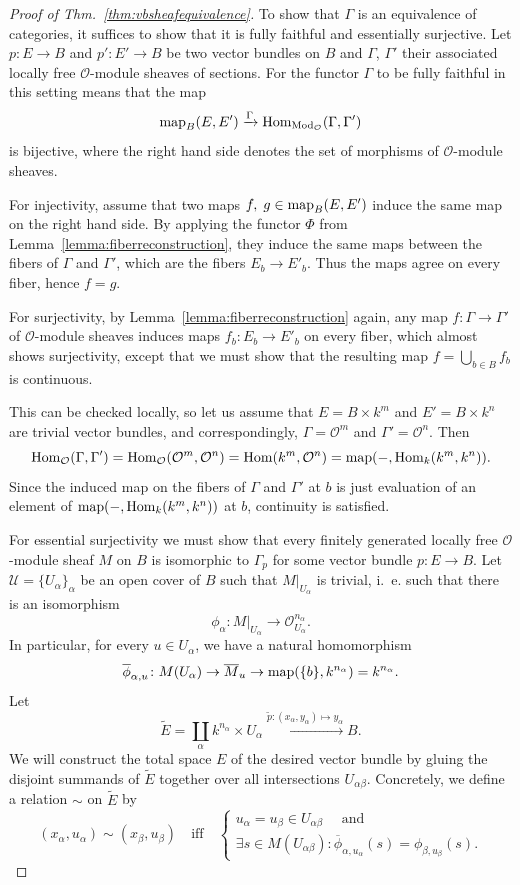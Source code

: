 \documentclass[a4paper,openany]{scrbook}
\begin{document}
\begin{proof}[Proof of Thm.~\ref{thm:vbsheafequivalence}]
To show that $\Gamma$ is an equivalence of categories, it suffices to show that it is fully faithful and essentially surjective. Let $p\colon E \to B$ and $p'\colon E' \to B$ be two vector bundles on $B$ and $\Gamma$, $\Gamma'$ their associated locally free $\mathcal O$-module sheaves of sections. For the functor $\Gamma$ to be fully faithful in this setting means that the map
\[
\operatorname{map}_B(E,E') \xrightarrow{\Gamma} \operatorname{Hom}_{\operatorname{Mod}_{\mathcal O}}(\Gamma,\Gamma')
\]
is bijective, where the right hand side denotes the set of morphisms of $\mathcal O$-module sheaves.

For injectivity, assume that two maps $f,\; g \in \operatorname{map}_B(E,E')$ induce the same map on the right hand side. By applying the functor $\Phi$ from Lemma~\ref{lemma:fiberreconstruction}, they induce the same maps between the fibers of $\Gamma$ and $\Gamma'$, which are the fibers $E_b \to E'_b$. Thus the maps agree on every fiber, hence $f=g$.

For surjectivity, by Lemma~\ref{lemma:fiberreconstruction} again, any map $f\colon \Gamma \to \Gamma'$ of $\mathcal O$-module sheaves induces maps $f_b\colon E_b \to E'_b$ on every fiber, which almost shows surjectivity, except that we must show that the resulting map $f = \bigcup_{b \in B} f_b$ is continuous.

This can be checked locally, so let us assume that $E = B \times k^m$ and $E' = B \times k^n$ are trivial vector bundles, and correspondingly, $\Gamma = \mathcal O^m$ and $\Gamma' = \mathcal O^n$. Then
\[
\operatorname{Hom}_{\mathcal O}(\Gamma,\Gamma') = \operatorname{Hom}_{\mathcal O}(\mathcal O^m,\mathcal O^n)  = \operatorname{Hom}(k^m,\mathcal O^n) = \operatorname{map}(-,\operatorname{Hom}_k(k^m,k^n)).
\]
Since the induced map on the fibers of $\Gamma$ and $\Gamma'$ at $b$ is just evaluation of an element of $\operatorname{map}(-,\operatorname{Hom}_k(k^m,k^n))$ at $b$, continuity is satisfied.

For essential surjectivity we must show that every finitely generated locally free $\mathcal O$-module sheaf $M$ on $B$ is isomorphic to $\Gamma_p$ for some vector bundle $p\colon E\to B$. Let $\mathcal U = \{U_\alpha\}_\alpha$ be an open cover of $B$ such that $ M|_{U_\alpha}$ is trivial, i.~e. such that there is an isomorphism
\[
\phi_\alpha\colon  M|_{U_\alpha} \to \mathcal O_{U_\alpha}^{n_\alpha}.
\]
In particular, for every $u \in U_\alpha$, we have a natural homomorphism
\[
\overline \phi_{\alpha,u}\colon M(U_\alpha) \to \overline M_u \to \operatorname{map}(\{b\},k^{n_\alpha}) = k^{n_\alpha}.
\]
Let
\[
\tilde E = \coprod_{\alpha} k^{n_\alpha} \times U_\alpha \xrightarrow{\tilde p\colon (x_\alpha,y_\alpha) \mapsto y_\alpha} B.
\]
We will construct the total space $E$ of the desired vector bundle by gluing the disjoint summands of $\tilde E$ together over all intersections $U_{\alpha\beta}$. Concretely, we define a relation $\sim$ on $\tilde E$ by
\[
(x_\alpha,u_\alpha) \sim (x_\beta,u_\beta) \quad \text{iff} \quad \left\{\begin{matrix}
u_\alpha=u_\beta \in U_{\alpha\beta} \quad\text{ and }\\
\exists s \in M(U_{\alpha\beta})\colon \overline \phi_{\alpha,u_\alpha}(s) = \phi_{\beta,u_\beta}(s).\end{matrix}\right.
\]


\end{proof}
\end{document}
